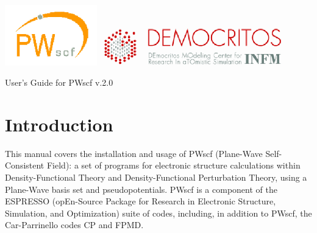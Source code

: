 \documentclass[12pt]{article}
\def\version{2.0}
\begin{document}
 
%
\includegraphics[width=4cm]{pwscf.png}\hfill
\includegraphics[width=8cm]{democritos.png}
%
%
\par\medskip
\centerline {\Huge User's Guide for PWscf v.\version}
\tableofcontents
\newpage

\section{Introduction}


This manual covers the installation and usage of PWscf (Plane-Wave 
Self-Consistent Field): a set of programs for electronic structure 
calculations within Density-Functional Theory and Density-Functional 
Perturbation Theory, using a Plane-Wave basis set and pseudopotentials. 
PWscf is a component of the ESPRESSO (opEn-Source Package for Research in 
Electronic Structure, Simulation, and Optimization) suite of codes,
including, in addition to PWscf, the Car-Parrinello codes CP and FPMD.

\end{document}
